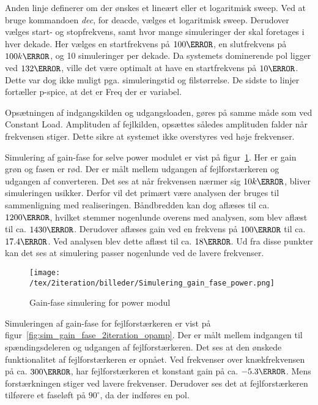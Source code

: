 Anden linje definerer om der ønskes et lineært eller et logaritmisk sweep. Ved at bruge kommandoen \textit{dec}, for deacde, vælges et logaritmisk sweep. Derudover vælges start- og stopfrekvens, samt hvor mange simuleringer der skal foretages i hver dekade. Her vælges en startfrekvens på $100\hertz$, en slutfrekvens på $100k\hertz$, og 10 simuleringer per dekade. Da systemets dominerende pol ligger ved $132\hertz$, ville det være optimalt at have en startfrekvens på $10\hertz$. Dette var dog ikke muligt pga. simuleringstid og filstørrelse. De sidste to linjer fortæller p-spice, at det er Freq der er variabel. 

Opsætningen af indgangskilden og udgangsloaden, gøres på samme måde som ved Constant Load. Amplituden af fejlkilden, opsættes således amplituden falder når frekvensen stiger. Dette sikre at systemet ikke overstyres ved høje frekvenser. 

Simulering af gain-fase for selve power modulet er vist på figur~\ref{fig:sim_gain_fase_power}. Her er gain grøn og fasen er rød. Der er målt mellem udgangen af fejlforstærkeren og udgangen af converteren. Det ses at når frekvensen nærmer sig $10k\hertz$, bliver simuleringen usikker. Derfor vil det primært være analysen der bruges til sammenligning med realiseringen. Båndbredden kan dog aflæses til ca. $1200\hertz$, hvilket stemmer nogenlunde overens med analysen, som blev aflæst til ca. $1430\hertz$. Derudover aflæses gain ved en frekvens på $100\hertz$ til ca. $17.4\decibel$. Ved analysen blev dette aflæst til ca. $18\decibel$. Ud fra disse punkter kan det ses at simulering passer nogenlunde ved de lavere frekvenser. 

\begin{figure}[H]
	\center
	\texttt{[image: /tex/2iteration/billeder/Simulering\_gain\_fase\_power.png]}
	\caption{Gain-fase simulering for power modul}
	\label{fig:sim_gain_fase_power}
\end{figure}

Simuleringen af gain-fase for fejlforstærkeren er vist på figur~\ref{fig:sim_gain_fase_2iteration_opamp}. Der er målt mellem indgangen til spændingsdeleren og udgangen af fejlforstærkeren. Det ses at den ønskede funktionalitet af fejlforstærkeren er opnået. Ved frekvenser over knækfrekvensen på ca. $300\hertz$, har fejlforstærkeren et konstant gain på ca. $-5.3\decibel$. Mens forstærkningen stiger ved lavere frekvenser. Derudover ses det at fejlforstærkeren tilførere et faseløft på $90^\circ$, da der indføres en pol.

